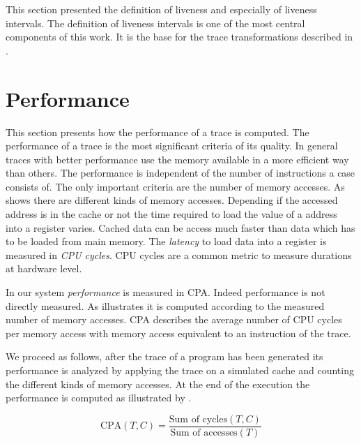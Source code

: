 \documentclass[onecolumn, openright, master, english, signatures]{dbrgrptt}
\begin{document}
This section presented the definition of liveness and especially of liveness intervals. The definition of liveness intervals is one of the most central components of this work. It is the base for the trace transformations described in .


\section{Performance}\label{sec:performance}

This section presents how the performance of a trace is computed. The performance of a trace is the most significant criteria of its quality. In general \ac{trace}s with better performance use the memory available in a more efficient way than others. The performance is independent of the number of instructions a case consists of. The only important criteria are the number of memory accesses. As  shows there are different kinds of memory accesses. Depending if the accessed address is in the cache or not the time required to load the value of a address into a register varies. Cached data can be access much faster than data which has to be loaded from main memory. The \emph{latency} to load data into a register is measured in \emph{\ac{CPU} cycles}. \ac{CPU} cycles are a common metric to measure durations at hardware level.

In our system \emph{performance} is measured in \ac{CPA}. Indeed performance is not directly measured. As  illustrates it is computed according to the measured number of memory accesses. \ac{CPA} describes the average number of \ac{CPU} cycles per memory access with memory access equivalent to an instruction of the trace.

We proceed as follows, after the \ac{trace} of a program has been generated its performance is analyzed by applying the trace on a simulated cache and counting the different kinds of memory accesses. At the end of the execution the performance is computed as illustrated by .

\begin{equation}\label{equ:performance-cpa}
\text{CPA}(T,C) = \frac{\text{Sum of cycles}(T, C)}{\text{Sum of accesses}(T)}
\end{equation}
\end{document}
